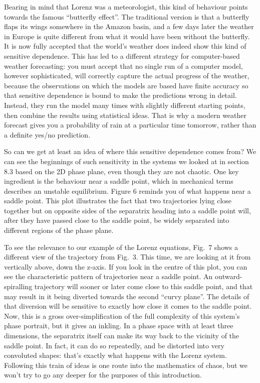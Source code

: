   Bearing in mind that Lorenz was a meteorologist, this kind of behaviour 
  points towards the famous ``butterfly effect''. The traditional version is 
  that a butterfly flaps its wings somewhere in the Amazon basin, and a few 
  days later the weather in Europe is quite different from what it would have 
  been without the butterfly. It is now fully accepted that the world's weather 
  does indeed show this kind of sensitive dependence. This has led to a 
  different strategy for computer-based weather forecasting: you must accept 
  that no single run of a computer model, however sophisticated, will correctly 
  capture the actual progress of the weather, because the observations on which 
  the models are based have finite accuracy so that sensitive dependence is 
  bound to make the predictions wrong in detail. Instead, they run the model 
  many times with slightly different starting points, then combine the results 
  using statistical ideas. That is why a modern weather forecast gives you a 
  probability of rain at a particular time tomorrow, rather than a definite 
  yes/no prediction. 

  So can we get at least an idea of where this sensitive dependence comes from? 
  We can see the beginnings of such sensitivity in the systems we looked at in 
  section 8.3 based on the 2D phase plane, even though they are not chaotic. 
  One key ingredient is the behaviour near a saddle point, which in mechanical 
  terms describes an unstable equilibrium. Figure 6 reminds you of what happens 
  near a saddle point. This plot illustrates the fact that two trajectories 
  lying close together but on opposite sides of the separatrix heading into a 
  saddle point will, after they have passed close to the saddle point, be 
  widely separated into different regions of the phase plane. 

  To see the relevance to our example of the Lorenz equations, Fig.\ 7 shows a 
  different view of the trajectory from Fig.\ 3. This time, we are looking at 
  it from vertically above, down the z-axis. If you look in the centre of this 
  plot, you can see the characteristic pattern of trajectories near a saddle 
  point. An outward-spiralling trajectory will sooner or later come close to 
  this saddle point, and that may result in it being diverted towards the 
  second ``curvy plane''. The details of that diversion will be sensitive to 
  exactly how close it comes to the saddle point. Now, this is a gross 
  over-simplification of the full complexity of this system's phase portrait, 
  but it gives an inkling. In a phase space with at least three dimensions, the 
  separatrix itself can make its way back to the vicinity of the saddle point. 
  In fact, it can do so repeatedly, and be distorted into very convoluted 
  shapes: that's exactly what happens with the Lorenz system. Following this 
  train of ideas is one route into the mathematics of chaos, but we won't try 
  to go any deeper for the purposes of this introduction. 

